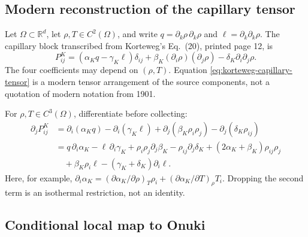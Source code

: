 \subsection*{Modern reconstruction of the capillary tensor}

Let \(\Omega\subset\mathbb R^d\), let \(\rho,T\in C^2(\Omega)\), and write
\(q=\partial_k\rho\,\partial_k\rho\) and
\(\ell=\partial_k\partial_k\rho\).  The capillary block transcribed from
Korteweg's Eq.~(20), printed page 12, is
\begin{equation}
 P^K_{ij}
 =\left(\alpha_K q-\gamma_K\ell\right)\delta_{ij}
  +\beta_K(\partial_i\rho)(\partial_j\rho)
  -\delta_K\partial_i\partial_j\rho .
 \label{eq:korteweg-capillary-tensor}
\end{equation}
The four coefficients may depend on \((\rho,T)\).  Equation
\eqref{eq:korteweg-capillary-tensor} is a modern tensor arrangement of the
source components, not a quotation of modern notation from 1901.

For \(\rho,T\in C^3(\Omega)\), differentiate before collecting:
\begin{align}
 \partial_jP^K_{ij}
 &=\partial_i(\alpha_K q)-\partial_i(\gamma_K\ell)
   +\partial_j(\beta_K\rho_i\rho_j)
   -\partial_j(\delta_K\rho_{ij}) \nonumber\\
 &=q\,\partial_i\alpha_K-\ell\,\partial_i\gamma_K
   +\rho_i\rho_j\partial_j\beta_K-\rho_{ij}\partial_j\delta_K
   +(2\alpha_K+\beta_K)\rho_{ij}\rho_j \nonumber\\
 &\quad+\beta_K\rho_i\ell
   -(\gamma_K+\delta_K)\partial_i\ell .
 \label{eq:korteweg-capillary-divergence}
\end{align}
Here, for example,
\(\partial_i\alpha_K=(\partial\alpha_K/\partial\rho)_T\rho_i
+(\partial\alpha_K/\partial T)_\rho T_i\).  Dropping the second term is an
isothermal restriction, not an identity.

\subsection*{Conditional local map to Onuki}

